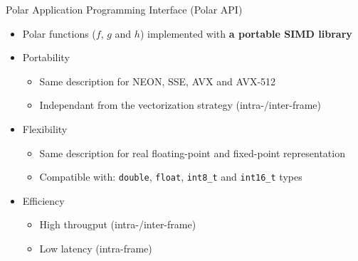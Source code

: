 \begin{frame}{Polar Application Programming Interface (Polar API)}
  \vfill
  \begin{itemize}
    \item Polar functions ($f$, $g$ and $h$) implemented with \textbf{a portable SIMD library}
    \vspace{0.2cm}
    \item Portability
    \begin{itemize}
      \item Same description for NEON, SSE, AVX and AVX-512
      \item Independant from the vectorization strategy (intra-/inter-frame)
    \end{itemize}
    \vspace{0.2cm}
    \pause
    \item Flexibility
    \begin{itemize}
      \item Same description for real floating-point and fixed-point representation
      \item Compatible with: \verb|double|, \verb|float|, \verb|int8_t| and \verb|int16_t| types
    \end{itemize}
    \vspace{0.2cm}
    \pause
    \item Efficiency
    \begin{itemize}
      \item High througput (intra-/inter-frame)
      \item Low latency (intra-frame)
    \end{itemize}
  \end{itemize}
  \vfill


\end{frame}

